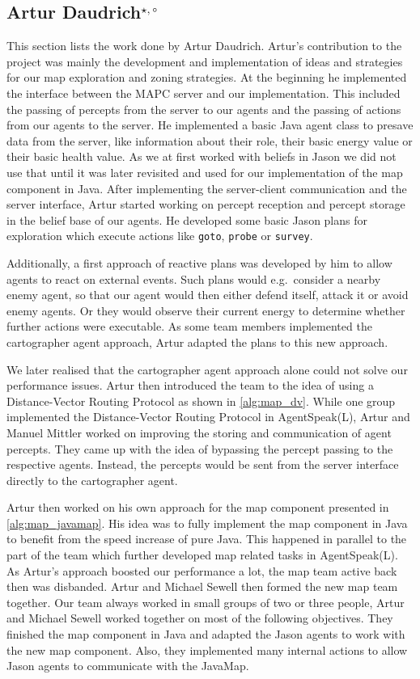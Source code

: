 \subsection[Artur Daudrich]{Artur Daudrich$^{\star,\circ}$}
This section lists the work done by Artur Daudrich.
Artur's contribution to the project was mainly the development and implementation of ideas and strategies for our map exploration and zoning strategies.
At the beginning he implemented the interface between the MAPC server and our implementation.
This included the passing of percepts from the server to our agents and the passing of actions from our agents to the server.
He implemented a basic Java agent class to presave data from the server, like information about their role, their basic energy value or their basic health value. 
As we at first worked with beliefs in Jason we did not use that until it was later revisited and used for our implementation of the map component in Java.
After implementing the server-client communication and the server interface, Artur started working on percept reception and percept storage in the belief base of our agents.
He developed some basic Jason plans for exploration which execute actions like \texttt{goto}, \texttt{probe} or \texttt{survey}.

Additionally, a first approach of reactive plans was developed by him to allow agents to react on external events.
Such plans would e.g.\ consider a nearby enemy agent, so that our agent would then either defend itself, attack it or avoid enemy agents.
Or they would observe their current energy to determine whether further actions were executable.
As some team members implemented the cartographer agent approach, Artur adapted the plans to this new approach.

We later realised that the cartographer agent approach alone could not solve our performance issues.
Artur then introduced the team to the idea of using a Distance-Vector Routing Protocol as shown in \autoref{alg:map_dv}.
While one group implemented the Distance-Vector Routing Protocol in AgentSpeak(L), Artur and Manuel Mittler worked on improving the storing and communication of agent percepts.
They came up with the idea of bypassing the percept passing to the respective agents.
Instead, the percepts would be sent from the server interface directly to the cartographer agent.

Artur then worked on his own approach for the map component presented in \autoref{alg:map_javamap}.
His idea was to fully implement the map component in Java to benefit from the speed increase of pure Java.
This happened in parallel to the part of the team which further developed map related tasks in AgentSpeak(L).
As Artur's approach boosted our performance a lot, the map team active back then was disbanded.
Artur and Michael Sewell then formed the new map team together.
Our team always worked in small groups of two or three people, Artur and Michael Sewell worked together on most of the following objectives.
They finished the map component in Java and adapted the Jason agents to work with the new map component.
Also, they implemented many internal actions to allow Jason agents to communicate with the JavaMap.

